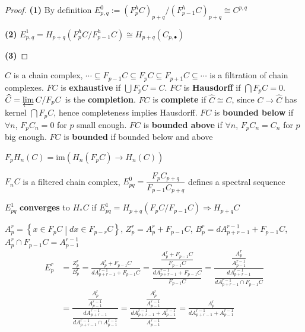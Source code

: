 \documentclass[main]{subfiles}
\begin{document}
\begin{proof}
\textbf{(1) }By definition $E^0_{p,q}:=(F^h_pC)_{p+q}/(F^h_{p-1}C)_{p+q}\cong C^{p,q}$ \par
\textbf{(2) }$E^1_{p,q}=H_{p+q}(F^h_pC/F^h_{p-1}C)\cong H_{p+q}(C_{p,\bullet})$ \par
\textbf{(3) }
\end{proof}

\begin{definition}
$C$ is a chain complex, $\cdots\subseteq F_{p-1}C\subseteq F_pC\subseteq F_{p+1}C\subseteq\cdots$ is a filtration of chain complexes. $FC$ is \textbf{exhaustive} if $\bigcup F_pC=C$. $FC$ is \textbf{Hausdorff} if $\bigcap F_pC=0$. $\widehat C=\varprojlim C/F_pC$ is the \textbf{completion}. $FC$ is \textbf{complete} if $\widehat C\cong C$, since $C\to\widehat C$ has kernel $\bigcap F_pC$, hence completeness implies Hausdorff. $FC$ is \textbf{bounded below} if $\forall n$, $F_pC_n=0$ for $p$ small enough. $FC$ is \textbf{bounded above} if $\forall n$, $F_pC_n=C_n$ for $p$ big enough. $FC$ is \textbf{bounded} if bounded below and above \par
$F_pH_n(C)=\mathrm{im}(H_n(F_pC)\to H_n(C))$
\end{definition}

\begin{definition}
$F_nC$ is a filtered chain complex, $E^0_{pq}=\dfrac{F_pC_{p+q}}{F_{p-1}C_{p+q}}$ defines a spectral sequence \par
$E^1_{pq}$ \textbf{converges} to $H_*C$ if $E^1_{pq}=H_{p+q}(F_pC/F_{p-1}C)\Rightarrow H_{p+q}C$
\end{definition}

\begin{theorem}
$A^r_p=\left\{x\in F_pC\middle|dx\in F_{p-r}C\right\}$, $Z_p^r=A_p^r+F_{p-1}C$, $B^r_p=dA^{r-1}_{p+r-1}+F_{p-1}C$, $A^r_p\cap F_{p-1}C=A^{r-1}_{p-1}$
\begin{align*}
E^r_p&=\frac{Z^r_p}{B^r_p}=\frac{A^r_p+F_{p-1}C}{dA^{r-1}_{p+r-1}+F_{p-1}C}=\frac{\dfrac{A^r_p+F_{p-1}C}{F_{p-1}C}}{\dfrac{dA^{r-1}_{p+r-1}+F_{p-1}C}{F_{p-1}C}}=\frac{\dfrac{A^r_p}{A^{r-1}_{p-1}}}{\dfrac{dA^{r-1}_{p+r-1}}{dA^{r-1}_{p+r-1}\cap F_{p-1}C}} \\
&=\frac{\dfrac{A^r_p}{A^{r-1}_{p-1}}}{\dfrac{dA^{r-1}_{p+r-1}}{dA^{r-1}_{p+r-1}\cap A_{p-1}^{r-1}}}=\frac{\dfrac{A^r_p}{A^{r-1}_{p-1}}}{\dfrac{dA^{r-1}_{p+r-1}+A_{p-1}^{r-1}}{A_{p-1}^{r-1}}}=\frac{A^r_p}{dA^{r-1}_{p+r-1}+A_{p-1}^{r-1}}
\end{align*}
\end{theorem}
\end{document}
